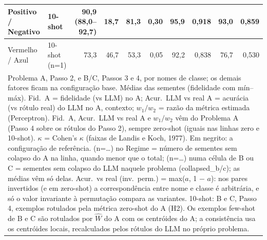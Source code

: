 \begin{table}[htbp]
\begin{tabular}{llrrrrrrrr}
Positivo / Negativo & 10-shot & 90,9 (88,0–92,7) & 18,7 & 81,3 & 0,30 & 95,9 & 0,918 & 93,0 & 0,859 \\
\midrule
Vermelho / Azul & 10-shot (n=1) & 73,3 & 46,7 & 53,3 & 0,05 & 92,2 & 0,838 & 76,7 & 0,530 \\
\bottomrule
\multicolumn{10}{p{0.95\linewidth}}{\footnotesize Problema A, Passo 2, e B/C, Passos 3 e 4, por nomes de classe; os demais fatores ficam na configuração base. Médias das sementes (fidelidade com mín–máx). Fid.\ A = fidelidade (vs LLM) no A; Acur.\ LLM vs real A = acurácia (vs rótulo real) do LLM no A, contexto; $w_1/w_2$ = razão da métrica estimada (Perceptron). Fid.\ A, Acur.\ LLM vs real A e $w_1/w_2$ vêm do Problema A (Passo 4 sobre os rótulos do Passo 2), sempre zero-shot (iguais nas linhas zero e 10-shot). $\kappa$ = Cohen's $\kappa$ (faixas de Landis e Koch, 1977). Em negrito: a configuração de referência. (n=…) no Regime = número de sementes sem colapso do A na linha, quando menor que o total; (n=…) numa célula de B ou C = sementes sem colapso do LLM naquele problema (collapsed\_b/c); as médias vêm só delas. Acur.\ vs real (inv.\ perm.) = max($a$, 1 $-$ $a$): nos pares invertidos (e em zero-shot) a correspondência entre nome e classe é arbitrária, e só o valor invariante à permutação compara as variantes. 10-shot: B e C, Passo 4, exemplos rotulados pela métrica zero-shot do A (H2). Os exemplos few-shot de B e C são rotulados por $\hat{W}$ do A com os centróides do A; a consistência usa os centróides locais, recalculados pelos rótulos do LLM no próprio problema.} \\
\end{tabular}
\end{table}
